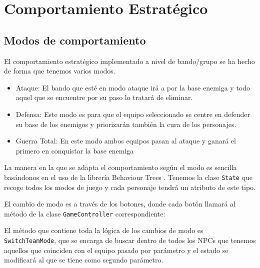  \section{Comportamiento Estratégico}
 \subsection{Modos de comportamiento}
 El comportamiento estratégico implementado a nivel de bando/grupo se ha hecho de forma que tenemos varios modos.
 \begin{itemize}
     \item Ataque: El bando que esté en modo ataque irá a por la base enemiga y todo aquel que se encuentre por su paso lo tratará de eliminar.
     \item Defensa: Este modo es para que el equipo seleccionado se centre en defender su base de los enemigos y priorizarán también la cura de los personajes.
     \item Guerra Total: En este modo ambos equipos pasan al ataque y ganará el primero en conquistar la base enemiga
 \end{itemize}
La manera en la que se adapta el comportamiento según el modo es sencilla basándonos en el uso de la librería Behaviour Trees \cite{uniBT}. Tenemos la clase \texttt{State} que recoge todos los modos de juego y cada personaje tendrá un atributo de este tipo.



El cambio de modo es a través de los botones, donde cada botón llamará al método de la clase \texttt{GameController} correspondiente:











El método que contiene toda la lógica de los cambios de modo es \texttt{SwitchTeamMode}, que se encarga de buscar dentro de todos los NPCs que tenemos  aquellos que coinciden con el equipo pasado por parámetro y el estado se modificará al que se tiene como segundo parámetro.


